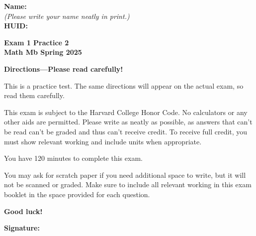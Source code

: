 \documentclass{article}
\begin{document}
{\large \mbox{} \hfill \bf Name:\underline{\hspace{3in}}}\\[2pt]
{\mbox{} \hfill \it (Please write your name neatly in print.)}\\[12pt]
{\large \mbox{} \hfill \bf HUID:\underline{\hspace{3in}}}
 
\medskip
 
\noindent
{\large\bf
Exam 1 Practice 2\\
Math Mb Spring 2025}
\noindent


{\Large
\begin{center}\textbf{Directions---Please read carefully!} \end{center}}

This is a practice test. The same directions will appear on the actual exam, so read them carefully.

\hrulefill 


This exam is subject to the Harvard College Honor Code. No calculators or any other aids are permitted.  Please write as neatly as possible, as answers that can't be read can't be graded and thus can't receive credit. To receive full credit, you must show relevant working
and include units when appropriate. 

You have 120 minutes to complete this exam. 

You may ask for scratch paper if you need additional space to write, but it will not be scanned or graded. Make sure to include all relevant working in this exam booklet in the space provided for each question.

\begin{center}\textbf{Good luck!}\end{center}


\vfill

\vspace{0.3in}

{\large \mbox{} \hfill \bf Signature:\underline{\hspace{3in}}}
\thispagestyle{empty}

\newpage
\end{document}

